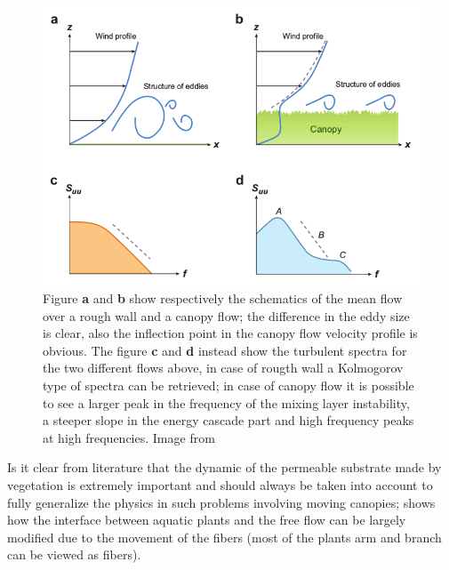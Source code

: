 \begin{figure}[h]
	\centering
	\includegraphics[width=0.7\linewidth]{chapter_1/spectra}
	\caption{Figure \textbf{a} and \textbf{b} show respectively the schematics of the mean flow over a rough wall and a canopy flow; the difference in the eddy size is clear, also the inflection point in the canopy flow velocity profile is obvious.
		The figure \textbf{c} and \textbf{d} instead show the turbulent spectra for the two different flows above, in case of rougth wall a Kolmogorov type of spectra can be retrieved; in case of canopy flow it is possible to see  a larger peak in the frequency of the mixing layer instability, a steeper slope in the energy cascade part and high frequency peaks at high frequencies. Image from \citet{de2008effects}}
		\label{fig:spectra}
	\end{figure}

Is it clear from literature that the dynamic of the permeable substrate made by vegetation is extremely important and should always be taken into account to fully generalize the physics in such problems involving moving canopies; \citet{nepf2012flow} shows how the interface between aquatic plants and the free flow can be largely modified due to the movement of the fibers (most of the plants arm and branch can be viewed as fibers).


